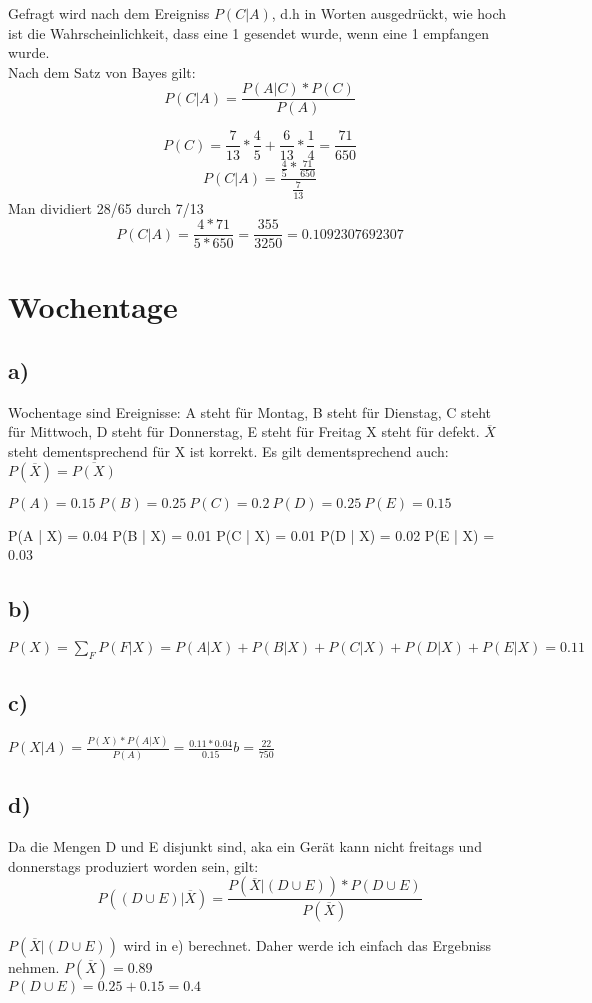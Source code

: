 \documentclass[]{article}
\begin{document}
Gefragt wird nach dem Ereigniss $P(C|A) $, d.h in Worten ausgedrückt, wie hoch ist die Wahrscheinlichkeit, dass eine 1 gesendet wurde, wenn eine 1 empfangen wurde.\\
Nach dem Satz von Bayes gilt:
$$ P(C|A) = \frac{P(A|C) *P(C)}{P(A)}$$

$$P(C) = \frac{7}{13} * \frac{4}{5}  +  \frac{6}{13} * \frac{1}{4}  = \frac{71}{650} $$
$$ P(C|A) = \frac{ \frac{4}{5} * \frac{71}{650}}{\frac{7}{13}} $$
Man dividiert 28/65 durch 7/13
$$P(C|A) = \frac{4 * 71 }{5 * 650 } = \frac{355}{3250} = 0.1092307692307 $$


\section{Wochentage}
\subsection{a)}
Wochentage sind Ereignisse:
A steht für Montag, 
B steht für Dienstag, 
C steht für Mittwoch,
D steht für Donnerstag,
E steht für Freitag
X steht f\"ur defekt.
$  \overline{X} $ steht dementsprechend f\"ur X ist korrekt.
Es gilt dementsprechend auch: $P(\overline{X}) = \overline{P(X)} $ 

$ P(A) = 0.15\
P(B) = 0.25\
P(C) = 0.2\
P(D) = 0.25\
P(E) = 0.15$

P(A | X) = 0.04
P(B | X) = 0.01
P(C | X) = 0.01
P(D | X) = 0.02
P(E | X) = 0.03

\subsection{b)}
$ P(X) = \sum_F P(F|X)   = P(A | X) +P(B | X) + P(C | X) + P(D | X) + P(E | X) = 0.11 $

\subsection{c)}
$P(X|A) = \frac{P(X) * P(A|X) }{P(A)} = \frac{0.11 * 0.04}{0.15}b = \frac{22}{750} $
\subsection{d)}
Da die Mengen D und E disjunkt sind, aka ein Ger\"at kann nicht freitags und donnerstags produziert worden sein, gilt:
$$ P( (D \cup E) | \overline{X} ) = \frac {P (\overline{X}| ( D \cup E)) * P(D \cup E) }{P(\overline{X})}  $$

$ P(\overline{X} | (D \cup E)) $ wird in e) berechnet. Daher werde ich einfach das Ergebniss nehmen. 
$ P(\overline{X}) = 0.89 $\\
$P (D \cup E) =  0.25 + 0.15 = 0.4$
\end{document}

